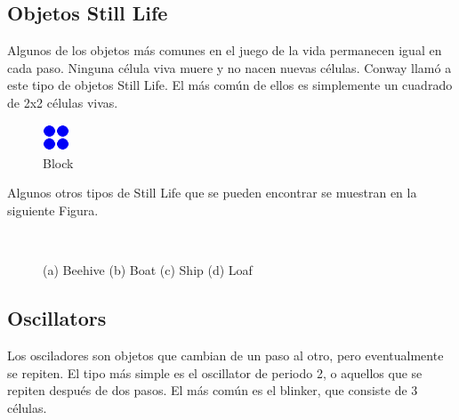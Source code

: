 \subsection{Objetos Still Life}
Algunos de los objetos más comunes en el juego de la vida permanecen igual en cada paso. Ninguna célula viva muere y no nacen nuevas células. Conway llamó a este tipo de  objetos Still Life.
El más común de ellos es simplemente un cuadrado de 2x2 células vivas. \cite{mathpaul}

\begin{figure}[h]
	\centering
	\includegraphics[width=0.07\textwidth]{capitulo1/images/block.png}
	\caption{Block}
	\label{fig:block}
\end{figure}

Algunos otros tipos de Still Life que se pueden encontrar se muestran en la siguiente Figura.

\begin{figure}
	\centering
	 \\
	\caption{(a) Beehive (b) Boat (c) Ship (d) Loaf}
	\label{fig:still_life}
\end{figure}
\newpage
\subsection{Oscillators}
Los osciladores son objetos que cambian de un paso al otro, pero eventualmente se repiten. El tipo más simple es el oscillator de periodo 2, o aquellos que se repiten después de dos pasos. El más común es el blinker, que consiste de 3 células.

